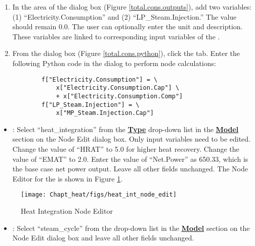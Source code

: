 \begin{itemize}
\begin{enumerate}
		\item In the  area of the  dialog box (Figure \ref{total.cons.outputs}), add two variables: (1) ``Electricity.Consumption'' and (2) ``LP\_Steam.Injection.'' The value should remain 0.0. The user can optionally enter the unit and description. These variables are linked to corresponding input variables of the .
					
		\item From the  dialog box (Figure \ref{total.cons.python}), click the  tab. Enter the following Python code in the dialog to perform node calculations:
		\begin{verbatim}
		f["Electricity.Consumption"] = \
			x["Electricity.Consumption.Cap"] \
			+ x["Electricity.Consumption.Comp"]
		f["LP_Steam.Injection"] = \
			x["MP_Steam.Injection.Cap"]
		\end{verbatim}
	\end{enumerate}
\end{itemize}

\begin{itemize} 
	\item {}: Select ``heat\_integration'' from the \textbf{\underline{Type}} drop-down list in the \textbf{\underline{Model}} section on the Node Edit dialog box. Only input variables need to be edited. Change the value of ``HRAT'' to 5.0 for higher heat recovery. Change the value of ``EMAT'' to 2.0. Enter the value of ``Net.Power'' as 650.33, which is the base case net power output. Leave all other fields unchanged. The Node Editor for the  is shown in Figure \ref{heat.int.node.edit}.
\end{itemize}

\begin{figure}[H]
	\begin{center}
		\texttt{[image: Chapt\_heat/figs/heat\_int\_node\_edit]}
		\caption{Heat Integration Node Editor}
		\label{heat.int.node.edit}
	\end{center}
\end{figure}

\begin{itemize}
	\item {}: Select ``steam\_cycle'' from the  drop-down list in the \textbf{\underline{Model}} section on the Node Edit dialog box and leave all other fields unchanged.
\end{itemize}

